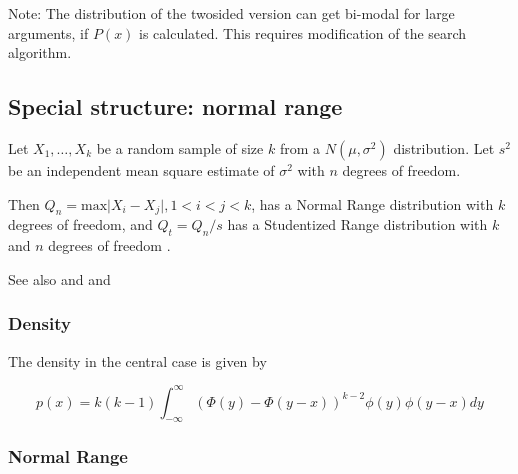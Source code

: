 Note: The distribution of the twosided version can get bi-modal for large arguments, if $P(x)$ is calculated. This requires modification of the search algorithm.


\subsection{Special structure: normal range}

Let $X_1, \dots, X_k$ be a random sample of size $k$ from a  $N(\mu, \sigma^2)$ distribution. Let $s^2$ be an independent mean square estimate of $\sigma^2$ with $n$ degrees of freedom.

Then $Q_n = \text{max} \vert X_i - X_j \vert, 1<i<j<k$, has a Normal Range distribution with $k$ degrees of freedom, and 
$Q_t = Q_n / s$ has a Studentized Range distribution with $k$ and $n$ degrees of freedom \cite{Hochberg_1987}.

See also \cite{Stoline_1978} and \cite{Harter_1960} and \cite{David_1972}

\subsubsection{Density}
\label{NormalRangeDistributionDensity}

The density in the central case is given by

\begin{equation}
	p(x) = k(k-1)  \int_{-\infty}^\infty \left( \Phi(y) - \Phi(y-x) \right)^{k-2} \phi(y) \phi(y-x) dy
\end{equation}

%
%
\subsubsection{Normal Range}

